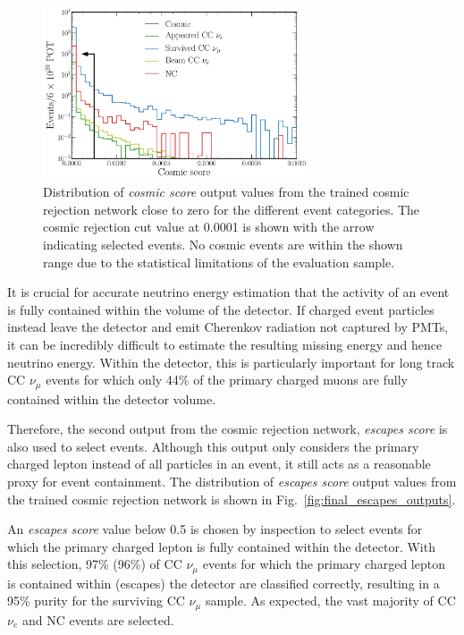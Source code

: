 \begin{figure} %
    \includegraphics[width=0.7\textwidth]{diagrams/7-results/final_cosmic_zoomed_outputs.pdf}
    \caption[Distribution of cosmic score output values close to zero]
    {Distribution of \emph{cosmic score} output values from the trained cosmic rejection network
        close to zero for the different event categories. The cosmic rejection cut value at 0.0001
        is shown with the arrow indicating selected events. No cosmic events are within the shown
        range due to the statistical limitations of the evaluation sample.}
    \label{fig:cosmic_zoomed_outputs}
\end{figure}

It is crucial for accurate neutrino energy estimation that the activity of an event is fully
contained within the volume of the detector. If charged event particles instead leave the detector
and emit Cherenkov radiation not captured by PMTs, it can be incredibly difficult to estimate the
resulting missing energy and hence neutrino energy. Within the \chipsfive detector, this is
particularly important for long track CC $\nu_{\mu}$ events for which only 44\% of the primary
charged muons are fully contained within the detector volume.

Therefore, the second output from the cosmic rejection network, \emph{escapes score} is also used
to select events. Although this output only considers the primary charged lepton instead of all
particles in an event, it still acts as a reasonable proxy for event containment. The distribution
of \emph{escapes score} output values from the trained cosmic rejection network is shown in
Fig.~\ref{fig:final_escapes_outputs}.

An \emph{escapes score} value below 0.5 is chosen by inspection to select events for which the
primary charged lepton is fully contained within the detector. With this selection, 97\% (96\%) of
CC $\nu_{\mu}$ events for which the primary charged lepton is contained within (escapes) the
detector are classified correctly, resulting in a 95\% purity for the surviving CC $\nu_{\mu}$
sample. As expected, the vast majority of CC $\nu_{e}$ and NC events are selected.

